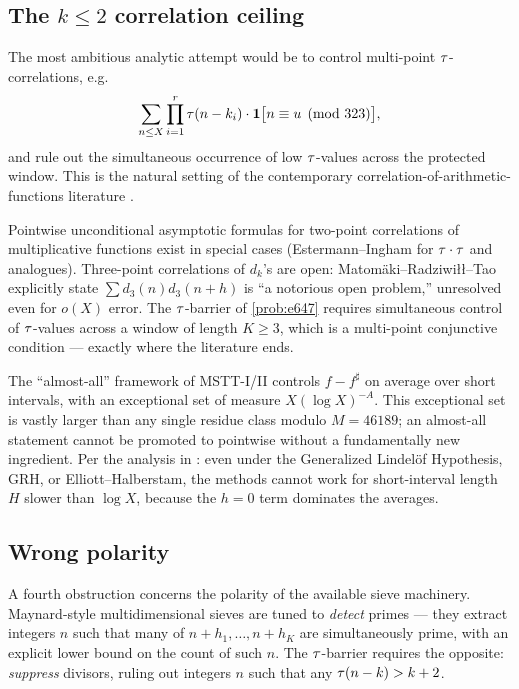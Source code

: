 \subsection{The $k \le 2$ correlation ceiling}
\label{sec:correlation-ceiling}

The most ambitious analytic attempt would be to control multi-point
$\tau$-correlations, e.g.\
\[
\sum_{n \le X} \prod_{i = 1}^{r} \tau(n - k_i) \cdot
\mathbf{1}\bigl[ n \equiv u \pmod{323} \bigr],
\]
and rule out the simultaneous occurrence of low $\tau$-values across
the protected window. This is the natural setting of the
contemporary correlation-of-arithmetic-functions literature
\cite{TaoTeravainen2025, MRT2019, MSTT2024_I, MSTT2024_II}.

\begin{remark}
\label{rem:correlation-ceiling}
Pointwise unconditional asymptotic formulas for two-point
correlations of multiplicative functions exist in special cases
(Estermann--Ingham for $\tau \cdot \tau$ and analogues). Three-point
correlations of $d_k$'s are open: Matom\"aki--Radziwi\l{}\l --Tao
\cite{MRT2019} explicitly state $\sum d_3(n) d_3(n + h)$ is ``a
notorious open problem,'' unresolved even for $o(X)$ error. The
$\tau$-barrier of \cref{prob:e647} requires simultaneous control of
$\tau$-values across a window of length $K \ge 3$, which is a
multi-point conjunctive condition --- exactly where the literature
ends.

The ``almost-all'' framework of MSTT-I/II
\cite{MSTT2024_I, MSTT2024_II} controls $f - f^\sharp$ on average
over short intervals, with an exceptional set of measure
$X (\log X)^{-A}$. This exceptional set is vastly larger than any
single residue class modulo $M = 46189$; an almost-all statement
cannot be promoted to pointwise without a fundamentally new
ingredient. Per the analysis in \cite[footnote 4]{MRT2019}: even
under the Generalized Lindel\"of Hypothesis, GRH, or
Elliott--Halberstam, the methods cannot work for short-interval
length $H$ slower than $\log X$, because the $h = 0$ term dominates
the averages.
\end{remark}

\subsection{Wrong polarity}
\label{sec:wrong-polarity}

A fourth obstruction concerns the polarity of the available sieve
machinery. Maynard-style multidimensional sieves
\cite{Maynard2013, Maynard2014} are tuned to \emph{detect} primes
--- they extract integers $n$ such that many of $n + h_1, \ldots,
n + h_K$ are simultaneously prime, with an explicit lower bound on
the count of such $n$. The $\tau$-barrier requires the opposite:
\emph{suppress} divisors, ruling out integers $n$ such that any
$\tau(n - k) > k + 2$.

